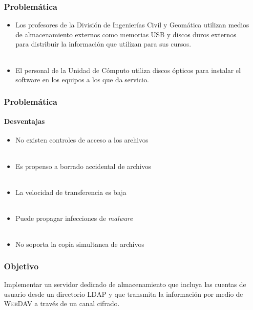 \documentclass{beamer}
\begin{document}
\begin{frame}
\frametitle{Problem\'{a}tica}

\begin{itemize}
\justifying
  \item Los profesores de la Divisi\'{o}n de Ingenier\'{i}as Civil y Geom\'{a}tica utilizan medios de almacenamiento externos como memorias USB y discos duros externos para distribuir la informaci\'{o}n que utilizan para sus cursos.
\\~\\
  \item El personal de la Unidad de C\'{o}mputo utiliza discos \'{o}pticos para instalar el software en los equipos a los que da servicio.
\end{itemize}



\end{frame}
\begin{frame}
\frametitle{Problem\'{a}tica}
\framesubtitle{Desventajas}
\justifying

\begin{itemize}
\justifying
  \item No existen controles de acceso a los archivos
\\~\\
  \item Es propenso a borrado accidental de archivos
\\~\\
  \item La velocidad de transferencia es baja
\\~\\
  \item Puede propagar infecciones de \textit{malware}
\\~\\
  \item No soporta la copia simultanea de archivos
\end{itemize}

\end{frame}
\begin{frame}

\frametitle{Objetivo}
\justifying

Implementar un servidor dedicado de almacenamiento que incluya las cuentas de usuario desde un directorio \textsc{LDAP} y que transmita la informaci\'{o}n por medio de \textsc{WebDAV} a trav\'{e}s de un canal cifrado.



\end{frame}
\end{document}
